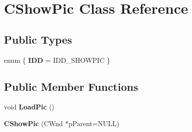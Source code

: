\hypertarget{class_c_show_pic}{\section{C\-Show\-Pic Class Reference}
\label{class_c_show_pic}
}
\subsection*{Public Types}
\begin{DoxyCompactItemize}
\item 
enum \{ {\bfseries I\-D\-D} =  I\-D\-D\-\_\-\-S\-H\-O\-W\-P\-I\-C
 \}
\end{DoxyCompactItemize}
\subsection*{Public Member Functions}
\begin{DoxyCompactItemize}
\item 
\hypertarget{class_c_show_pic_ad67161c5f8e1fd7d621573e237cb6f67}{void {\bfseries Load\-Pic} ()}\label{class_c_show_pic_ad67161c5f8e1fd7d621573e237cb6f67}

\item 
\hypertarget{class_c_show_pic_a61dc4859732f91055091536cadfb4f9e}{{\bfseries C\-Show\-Pic} (C\-Wnd $\ast$p\-Parent=N\-U\-L\-L)}\label{class_c_show_pic_a61dc4859732f91055091536cadfb4f9e}

\end{DoxyCompactItemize}
